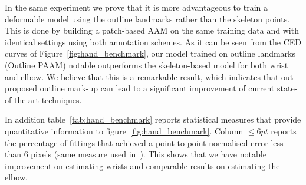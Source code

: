 In the same experiment we prove that it is more advantageous to train a deformable model using the outline landmarks rather than the skeleton points. This is done by building a patch-based AAM on the same training data and with identical settings using both annotation schemes. As it can be seen from the  CED curves of Figure~\ref{fig:hand_benchmark}, our model trained on outline landmarks (Outline PAAM) notable outperforms the skeleton-based model for both wrist and elbow. We believe that this is a remarkable result, which indicates that out proposed outline mark-up can lead to a significant improvement of current state-of-the-art techniques.

In addition table~\ref{tab:hand_benchmark} reports statistical measures that provide quantitative information to figure~\ref{fig:hand_benchmark}. Column $\leq 6pt$ reports the percentage of fittings that achieved a point-to-point normalised error less than 6 pixels (same measure used in~\cite{pfister2015flowing}). This shows that we have notable improvement on estimating wrists and comparable results on estimating the elbow.

